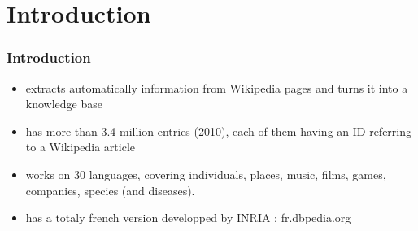 \documentclass{beamer}
\begin{document}
  	\section{Introduction}
  	\begin{frame}
  		\frametitle{Introduction}
  		\begin{itemize}
  			\item extracts automatically information from Wikipedia pages and turns it into a knowledge base
  			\item has more than 3.4 million entries (2010), each of them having an ID referring to a Wikipedia article
  			\item works on 30 languages, covering individuals, places, music, films, games, companies, species (and diseases). 
  			\item has a totaly french version developped by INRIA : fr.dbpedia.org
  		\end{itemize}
  	\end{frame}
  	
  	
  	
  
\end{document}
